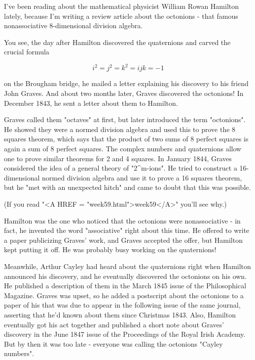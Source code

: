 


I've been reading about the mathematical physicist William Rowan 
Hamilton lately, because I'm writing a review article about the 
octonions - that famous nonassociative 8-dimensional division 
algebra.  

You see, the day after Hamilton discovered the quaternions and carved 
the crucial formula

$$
                i^{2} = j^{2} = k^{2} = ijk = -1
$$
    
on the Brougham bridge, he mailed a letter explaining his discovery
to his friend John Graves.  And about two months later, Graves 
discovered the octonions!  In December 1843, he sent a letter about 
them to Hamilton.   

Graves called them "octaves" at first, but later introduced
the term "octonions".  He showed they were a normed division
algebra and used this to prove the 8 squares theorem, which says that
the product of two sums of 8 perfect squares is again a sum of 8 perfect
squares.  The complex numbers and quaternions allow one to prove similar
theorems for 2 and 4 squares.  In January 1844, Graves considered the
idea of a general theory of "2^{m}-ions".  He tried 
to construct
a 16-dimensional normed division algebra and use it to prove a 16
squares theorem, but he "met with an unexpected hitch" and came to
doubt that this was possible.  

(If you read "<A HREF = "week59.html">week59</A>" you'll see why.)

Hamilton was the one who noticed that the octonions were nonassociative - in 
fact, he invented the word "associative" right about this time.  He 
offered to write a paper publicizing Graves' work, and Graves accepted 
the offer, but Hamilton kept putting it off.  He was probably busy 
working on the quaternions!  

Meanwhile, Arthur Cayley had heard about the quaternions right when 
Hamilton announced his discovery, and he eventually discovered the 
octonions on his own.  He published a description of them in the March 
1845 issue of the Philosophical Magazine.  Graves was upset, so he added 
a postscript about the octonions to a paper of his that was due to 
appear in the following issue of the same journal, asserting that 
he'd known about them since Christmas 1843.  Also, Hamilton eventually 
got his act together and published a short note about Graves' discovery 
in the June 1847 issue of the Proceedings of the Royal Irish Academy.  
But by then it was too late - everyone was calling the octonions "Cayley 
numbers".

